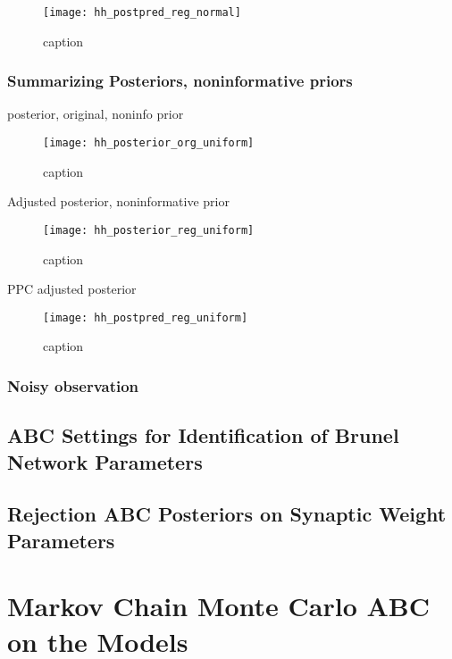 \begin{figure}[H]
    \centering
    \texttt{[image: hh\_postpred\_reg\_normal]}
    \caption{caption}
    \label{fig:fig1}
\end{figure}


\subsection{Summarizing Posteriors, noninformative priors}

posterior, original, noninfo prior

\begin{figure}[H]
    \centering
    \texttt{[image: hh\_posterior\_org\_uniform]}
    \caption{caption}
    \label{fig:fig1}
\end{figure}

Adjusted posterior, noninformative prior

\begin{figure}[H]
    \centering
    \texttt{[image: hh\_posterior\_reg\_uniform]}
    \caption{caption}
    \label{fig:fig1}
\end{figure} 

PPC adjusted posterior 

\begin{figure}[H]
    \centering
    \texttt{[image: hh\_postpred\_reg\_uniform]}
    \caption{caption}
    \label{fig:fig1}
\end{figure}

\subsection{Noisy observation} 


\section{ABC Settings for Identification of Brunel Network Parameters}

\section{Rejection ABC Posteriors on Synaptic Weight Parameters}

\chapter{Markov Chain Monte Carlo ABC on the Models}
